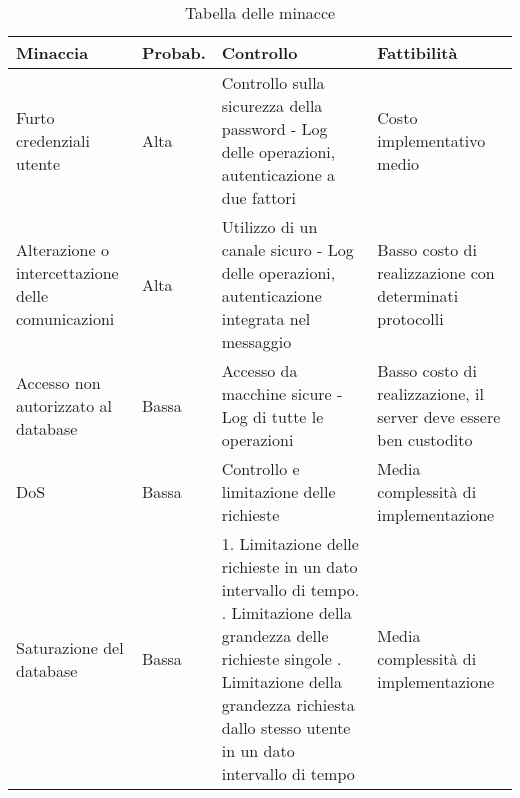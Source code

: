 \begin{table}[htbp]
    \centering
    \begin{tabular} {|P{3cm}|P{2cm}|P{6.1cm}|P{4cm}|}
        \hline
        \textbf{Minaccia}                                 & \textbf{Probab.} & \textbf{Controllo}                                                                                                                                                                                                                      & \textbf{Fattibilità}                                              \\
        \hline
        Furto credenziali utente                          & Alta             & Controllo sulla sicurezza della password - Log delle operazioni, autenticazione a due fattori                                                                                                                                           & Costo implementativo medio                                        \\
        \hline
        Alterazione o intercettazione delle comunicazioni & Alta             & Utilizzo di un canale sicuro - Log delle operazioni, autenticazione integrata nel messaggio                                                                                                                                             & Basso costo di realizzazione con determinati protocolli           \\
        \hline
        Accesso non autorizzato al database               & Bassa            & Accesso da macchine sicure - Log di tutte le operazioni                                                                                                                                                                                 & Basso costo di realizzazione, il server deve essere ben custodito \\
        \hline
        DoS                                               & Bassa            & Controllo e limitazione delle richieste                                                                                                                                                                                                 & Media complessità di implementazione                              \\
        \hline
        Saturazione del database                          & Bassa            & 1. Limitazione delle richieste in un dato intervallo di tempo. . Limitazione della grandezza delle richieste singole . Limitazione della grandezza richiesta dallo stesso utente in un dato intervallo di tempo & Media complessità di implementazione                              \\
        \hline
    \end{tabular}

    \caption{Tabella delle minacce}
    \label{<label>}
\end{table}

